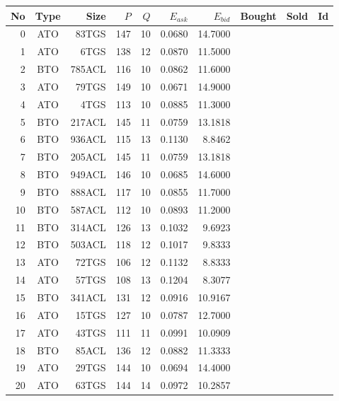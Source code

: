 \begin{tabular}{|r|c|r|r|r|r|r|p{2cm}|p{2cm}|r|}
\hline

No & Type & Size & $P$ & $Q$ & $E_{ask}$ & $E_{bid}$ & Bought & Sold & Id \\
\hline
0 & ATO & 83TGS & 147 & 10 & 0.0680 & 14.7000 &    &    &    \\
\hline
1 & ATO & 6TGS & 138 & 12 & 0.0870 & 11.5000 &    &    &    \\
\hline
2 & BTO & 785ACL & 116 & 10 & 0.0862 & 11.6000 &    &    &    \\
\hline
3 & ATO & 79TGS & 149 & 10 & 0.0671 & 14.9000 &    &    &    \\
\hline
4 & ATO & 4TGS & 113 & 10 & 0.0885 & 11.3000 &    &    &    \\
\hline
5 & BTO & 217ACL & 145 & 11 & 0.0759 & 13.1818 &    &    &    \\
\hline
6 & BTO & 936ACL & 115 & 13 & 0.1130 & 8.8462 &    &    &    \\
\hline
7 & BTO & 205ACL & 145 & 11 & 0.0759 & 13.1818 &    &    &    \\
\hline
8 & BTO & 949ACL & 146 & 10 & 0.0685 & 14.6000 &    &    &    \\
\hline
9 & BTO & 888ACL & 117 & 10 & 0.0855 & 11.7000 &    &    &    \\
\hline
10 & BTO & 587ACL & 112 & 10 & 0.0893 & 11.2000 &    &    &    \\
\hline
11 & BTO & 314ACL & 126 & 13 & 0.1032 & 9.6923 &    &    &    \\
\hline
12 & BTO & 503ACL & 118 & 12 & 0.1017 & 9.8333 &    &    &    \\
\hline
13 & ATO & 72TGS & 106 & 12 & 0.1132 & 8.8333 &    &    &    \\
\hline
14 & ATO & 57TGS & 108 & 13 & 0.1204 & 8.3077 &    &    &    \\
\hline
15 & BTO & 341ACL & 131 & 12 & 0.0916 & 10.9167 &    &    &    \\
\hline
16 & ATO & 15TGS & 127 & 10 & 0.0787 & 12.7000 &    &    &    \\
\hline
17 & ATO & 43TGS & 111 & 11 & 0.0991 & 10.0909 &    &    &    \\
\hline
18 & BTO & 85ACL & 136 & 12 & 0.0882 & 11.3333 &    &    &    \\
\hline
19 & ATO & 29TGS & 144 & 10 & 0.0694 & 14.4000 &    &    &    \\
\hline
20 & ATO & 63TGS & 144 & 14 & 0.0972 & 10.2857 &    &    &    \\
\hline

\end{tabular}
